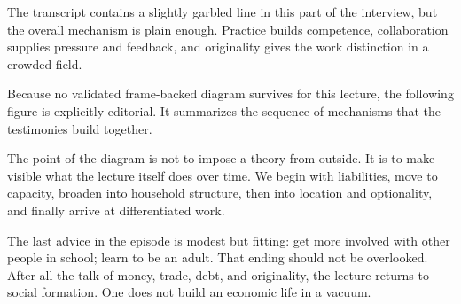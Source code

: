 The transcript contains a slightly garbled line in this part of the interview, but the overall mechanism is plain enough. Practice builds competence, collaboration supplies pressure and feedback, and originality gives the work distinction in a crowded field.

Because no validated frame-backed diagram survives for this lecture, the following figure is explicitly editorial. It summarizes the sequence of mechanisms that the testimonies build together.

\begin{figure}
\begin{center}
\end{center}
\end{figure}

The point of the diagram is not to impose a theory from outside. It is to make visible what the lecture itself does over time. We begin with liabilities, move to capacity, broaden into household structure, then into location and optionality, and finally arrive at differentiated work.

The last advice in the episode is modest but fitting: get more involved with other people in school; learn to be an adult. That ending should not be overlooked. After all the talk of money, trade, debt, and originality, the lecture returns to social formation. One does not build an economic life in a vacuum.

